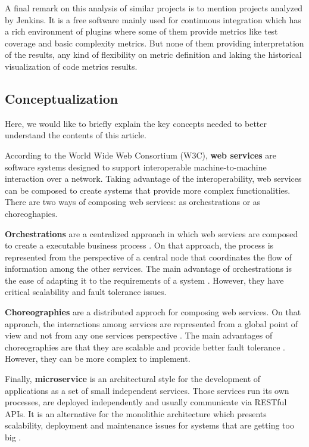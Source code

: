 A final remark on this analysis of similar projects is to mention projects analyzed by Jenkins. It is a free software mainly used for continuous integration which has a rich environment of plugins where some of them provide metrics like test coverage and basic complexity metrics. But none of them providing interpretation of the results, any kind of flexibility on metric definition and laking the historical visualization of code metrics results.

\subsection{Conceptualization}
\label{sec:conceptualization}

Here, we would like to briefly explain the key concepts needed to better understand the contents of this article.

According to the World Wide Web Consortium (W3C), \textbf{web services} are software systems designed to support interoperable machine-to-machine interaction over a network. Taking advantage of the interoperability, web services can be composed to create systems that provide more complex functionalities. There are two ways of composing web services: as orchestrations or as choreoghapies. 

\textbf{Orchestrations} are a centralized approach in which web services are composed to create a executable business process \cite{peltz2003web}. On that approach, the process is represented from the perspective of a central node that coordinates the flow of information among the other services. The main advantage of orchestrations is the ease of adapting it to the requirements of a system \cite{decker2008introduction}. However, they have critical scalability and fault tolerance issues.

\textbf{Choreographies} are a distributed approch for composing web services. On that approach, the interactions among services are represented from a global point of view and not from any one services perspective \cite{ross2005orchestration}. The main advantages of choreographies are that they are scalable and provide better fault tolerance \cite{pontes2012performance}. However, they can be more complex to implement.

Finally, \textbf{microservice} is an architectural style for the development of applications as a set of small independent services. Those services run its own processes, are deployed independently and usually communicate via RESTful APIs. It is an alternative for the monolithic architecture which presents scalability, deployment and maintenance issues for systems that are getting too big \cite{namiot2014micro}.
